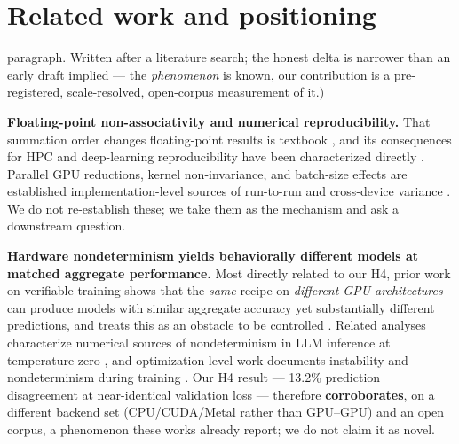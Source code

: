 \documentclass{article}
\begin{document}
\section{Related work and positioning}
paragraph. Written after a literature search; the honest delta is narrower than an early draft
implied --- the \emph{phenomenon} is known, our contribution is a pre-registered, scale-resolved,
open-corpus measurement of it.)

\textbf{Floating-point non-associativity and numerical reproducibility.} That summation order
changes floating-point results is textbook \citep{goldberg1991}, and its consequences for HPC and
deep-learning reproducibility have been characterized directly \citep{shanmugavelu2024fpna}. Parallel GPU
reductions, kernel non-invariance, and batch-size effects are established implementation-level
sources of run-to-run and cross-device variance \citep{shanmugavelu2024fpna,pytorch_repro,nvidia_determinism}.
We do not re-establish these; we take them as the mechanism and ask a downstream question.

\textbf{Hardware nondeterminism yields behaviorally different models at matched aggregate
performance.} Most directly related to our H4, prior work on verifiable training shows that the
\emph{same} recipe on \emph{different GPU architectures} can produce models with similar aggregate
accuracy yet substantially different predictions, and treats this as an obstacle to be
controlled \citep{srivastava2024verifiable}. Related analyses characterize numerical sources of
nondeterminism in LLM inference at temperature zero \citep{yuan2025llminfer}, and optimization-level
work documents instability and nondeterminism during training \citep{summers2021,zhuang2022}. Our
H4 result --- 13.2\% prediction disagreement at near-identical validation loss --- therefore
\textbf{corroborates}, on a different backend set (CPU/CUDA/Metal rather than GPU--GPU) and an open
corpus, a phenomenon these works already report; we do not claim it as novel.
\end{document}

